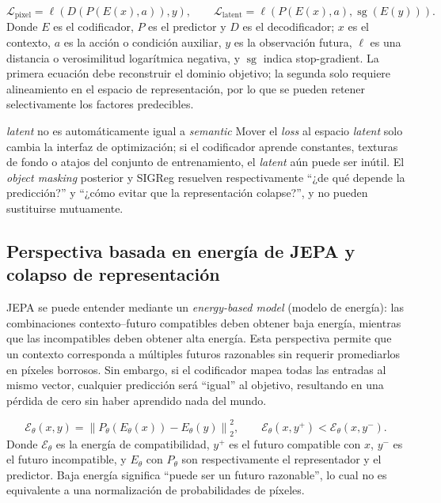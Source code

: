 
\[
\mathcal{L}_{\text{pixel}}=\ell\!\left(D(P(E(x),a)),y\right),
\qquad
\mathcal{L}_{\text{latent}}=\ell\!\left(P(E(x),a),\operatorname{sg}(E(y))\right).
\]
Donde $E$ es el codificador, $P$ es el predictor y $D$ es el decodificador; $x$ es el contexto, $a$ es la acción o condición auxiliar, $y$ es la observación futura, $\ell$ es una distancia o verosimilitud logarítmica negativa, y $\operatorname{sg}$ indica stop-gradient. La primera ecuación debe reconstruir el dominio objetivo; la segunda solo requiere alineamiento en el espacio de representación, por lo que se pueden retener selectivamente los factores predecibles.

\begin{warningbox}{\textit{latent} no es automáticamente igual a \textit{semantic}}
Mover el \textit{loss} al espacio \textit{latent} solo cambia la interfaz de optimización; si el codificador aprende constantes, texturas de fondo o atajos del conjunto de entrenamiento, el \textit{latent} aún puede ser inútil. El \textit{object masking} posterior y SIGReg resuelven respectivamente ``¿de qué depende la predicción?'' y ``¿cómo evitar que la representación colapse?'', y no pueden sustituirse mutuamente.
\end{warningbox}

\subsection{Perspectiva basada en energía de JEPA y colapso de representación}

JEPA se puede entender mediante un \textit{energy-based model} (modelo de energía): las combinaciones contexto--futuro compatibles deben obtener baja energía, mientras que las incompatibles deben obtener alta energía. Esta perspectiva permite que un contexto corresponda a múltiples futuros razonables sin requerir promediarlos en píxeles borrosos. Sin embargo, si el codificador mapea todas las entradas al mismo vector, cualquier predicción será ``igual'' al objetivo, resultando en una pérdida de cero sin haber aprendido nada del mundo.


\[
\mathcal{E}_\theta(x,y)=\left\|P_\theta(E_\theta(x))-E_\theta(y)\right\|_2^2,
\qquad
\mathcal{E}_\theta(x,y^+) < \mathcal{E}_\theta(x,y^-).
\]
Donde $\mathcal{E}_\theta$ es la energía de compatibilidad, $y^+$ es el futuro compatible con $x$, $y^-$ es el futuro incompatible, y $E_\theta$ con $P_\theta$ son respectivamente el representador y el predictor. Baja energía significa ``puede ser un futuro razonable'', lo cual no es equivalente a una normalización de probabilidades de píxeles.

